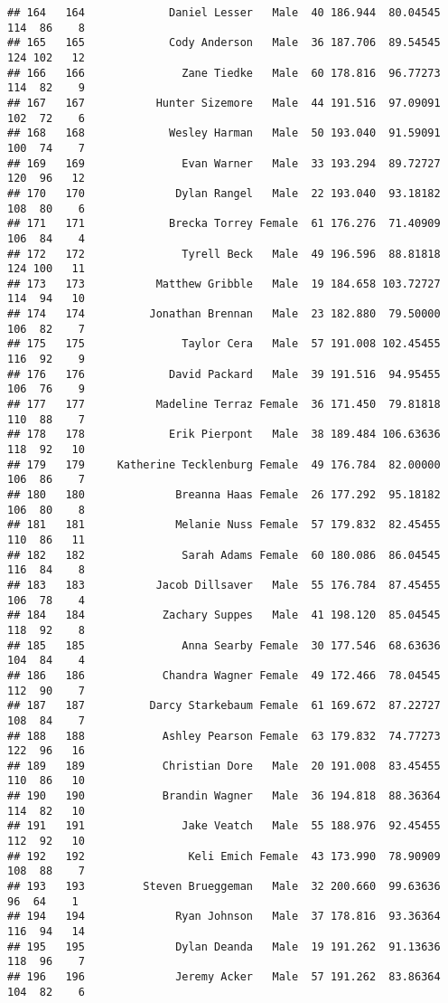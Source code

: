 \documentclass[
]{article}
\begin{document}
\begin{verbatim}
## 164   164             Daniel Lesser   Male  40 186.944  80.04545 114  86    8
## 165   165             Cody Anderson   Male  36 187.706  89.54545 124 102   12
## 166   166               Zane Tiedke   Male  60 178.816  96.77273 114  82    9
## 167   167           Hunter Sizemore   Male  44 191.516  97.09091 102  72    6
## 168   168             Wesley Harman   Male  50 193.040  91.59091 100  74    7
## 169   169               Evan Warner   Male  33 193.294  89.72727 120  96   12
## 170   170              Dylan Rangel   Male  22 193.040  93.18182 108  80    6
## 171   171             Brecka Torrey Female  61 176.276  71.40909 106  84    4
## 172   172               Tyrell Beck   Male  49 196.596  88.81818 124 100   11
## 173   173           Matthew Gribble   Male  19 184.658 103.72727 114  94   10
## 174   174          Jonathan Brennan   Male  23 182.880  79.50000 106  82    7
## 175   175               Taylor Cera   Male  57 191.008 102.45455 116  92    9
## 176   176             David Packard   Male  39 191.516  94.95455 106  76    9
## 177   177           Madeline Terraz Female  36 171.450  79.81818 110  88    7
## 178   178             Erik Pierpont   Male  38 189.484 106.63636 118  92   10
## 179   179     Katherine Tecklenburg Female  49 176.784  82.00000 106  86    7
## 180   180              Breanna Haas Female  26 177.292  95.18182 106  80    8
## 181   181              Melanie Nuss Female  57 179.832  82.45455 110  86   11
## 182   182               Sarah Adams Female  60 180.086  86.04545 116  84    8
## 183   183           Jacob Dillsaver   Male  55 176.784  87.45455 106  78    4
## 184   184            Zachary Suppes   Male  41 198.120  85.04545 118  92    8
## 185   185               Anna Searby Female  30 177.546  68.63636 104  84    4
## 186   186            Chandra Wagner Female  49 172.466  78.04545 112  90    7
## 187   187          Darcy Starkebaum Female  61 169.672  87.22727 108  84    7
## 188   188            Ashley Pearson Female  63 179.832  74.77273 122  96   16
## 189   189            Christian Dore   Male  20 191.008  83.45455 110  86   10
## 190   190            Brandin Wagner   Male  36 194.818  88.36364 114  82   10
## 191   191               Jake Veatch   Male  55 188.976  92.45455 112  92   10
## 192   192                Keli Emich Female  43 173.990  78.90909 108  88    7
## 193   193         Steven Brueggeman   Male  32 200.660  99.63636  96  64    1
## 194   194              Ryan Johnson   Male  37 178.816  93.36364 116  94   14
## 195   195              Dylan Deanda   Male  19 191.262  91.13636 118  96    7
## 196   196              Jeremy Acker   Male  57 191.262  83.86364 104  82    6

\end{verbatim}
\end{document}
